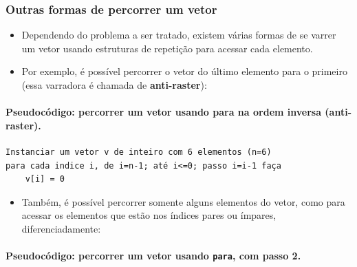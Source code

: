 \documentclass[12pt,a4paper]{article}
\providecommand{\tightlist}{%
      \setlength{\itemsep}{0pt}\setlength{\parskip}{0pt}}
\begin{document}
    \hypertarget{outras-formas-de-percorrer-um-vetor}{%
\subsubsection{Outras formas de percorrer um
vetor}\label{outras-formas-de-percorrer-um-vetor}}

    \begin{itemize}
\tightlist
\item
  Dependendo do problema a ser tratado, existem várias formas de se
  varrer um vetor usando estruturas de repetição para acessar cada
  elemento.
\item
  Por exemplo, é possível percorrer o vetor do último elemento para o
  primeiro (essa varradora é chamada de \textbf{anti-raster}):
\end{itemize}

    \hypertarget{pseudocuxf3digo-percorrer-um-vetor-usando-para-na-ordem-inversa-anti-raster.}{%
\paragraph{\texorpdfstring{Pseudocódigo: percorrer um vetor usando para
na ordem inversa
(\textbf{anti-raster}).}{Pseudocódigo: percorrer um vetor usando para na ordem inversa (anti-raster).}}\label{pseudocuxf3digo-percorrer-um-vetor-usando-para-na-ordem-inversa-anti-raster.}}

    \begin{verbatim}
Instanciar um vetor v de inteiro com 6 elementos (n=6)
para cada indice i, de i=n-1; até i<=0; passo i=i-1 faça
    v[i] = 0
\end{verbatim}

    \begin{itemize}
\tightlist
\item
  Também, é possível percorrer somente alguns elementos do vetor, como
  para acessar os elementos que estão nos índices pares ou ímpares,
  diferenciadamente:
\end{itemize}

    \hypertarget{pseudocuxf3digo-percorrer-um-vetor-usando-para-com-passo-2.}{%
\paragraph{\texorpdfstring{Pseudocódigo: percorrer um vetor usando
\texttt{para}, com passo
2.}{Pseudocódigo: percorrer um vetor usando para, com passo 2.}}\label{pseudocuxf3digo-percorrer-um-vetor-usando-para-com-passo-2.}}
\end{document}
